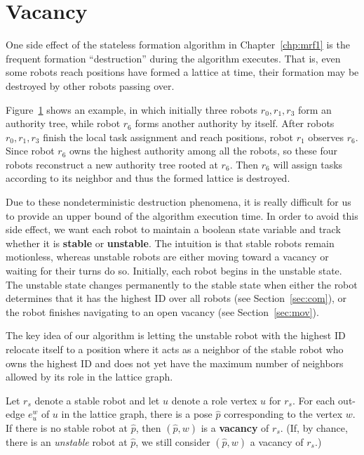 \section{Vacancy}
\label{sec:vacancy}
One side effect of the stateless formation algorithm in Chapter~\ref{chp:mrf1} is the frequent formation ``destruction'' during the algorithm executes. 
%
That is, even some robots reach positions have formed 
a lattice at time, their formation may be destroyed by other robots passing over. 


Figure~\ref{fig:destruction} shows an example, in which initially three robots $r_0, r_1, r_3$ form an authority tree, while robot $r_6$ forms another authority by itself.
%
After robots $r_0, r_1, r_3$ finish the local task assignment and reach positions, robot $r_1$ observes $r_6$.
%
Since robot $r_6$ owns the highest authority among all the robots, so these four robots reconstruct a new authority tree rooted at $r_6$. Then $r_6$ will assign tasks according to its neighbor and thus the formed lattice is destroyed.

\begin{figure}
\centering  

\label{fig:destruction}
\end{figure}

Due to these nondeterministic destruction phenomena, it is really difficult for us to provide 
an upper bound of the algorithm execution time. 
%
In order to avoid this side effect, we want each robot to maintain a boolean state variable 
and track whether it is \textbf{stable} or \textbf{unstable}.  
%
The intuition is that stable robots remain motionless, whereas unstable robots
are either moving toward a vacancy or waiting for their turns do so.
%
Initially, each robot begins in the unstable state.
%
The unstable state changes permanently to the stable state when either the robot determines
that it has the highest ID over all robots (see Section~\ref{sec:com}), or the
robot finishes navigating to an open vacancy (see Section~\ref{sec:mov}).


The key idea of our algorithm is letting the unstable robot with the highest ID relocate itself 
to a position where it acts as a neighbor of the stable robot who owns the highest ID 
and does not yet have the maximum number of neighbors allowed by its role in the
lattice graph.

\begin{defn}
  Let $r_s$ denote a stable robot and let $u$ denote a role vertex $u$ for
  $r_s$.  For each out-edge $e_{u}^w$ of $u$ in the lattice graph, there is a
  pose $\hat{p}$ corresponding to the vertex $w$. 
  If there is no stable robot
  at $\hat{p}$, then $(\hat{p}, w)$ is a \textbf{vacancy} of $r_s$.
  (If, by chance, there is an \emph{unstable} robot at $\hat{p}$,
  we still consider $(\hat{p}, w)$ a vacancy of $r_s$.)
\end{defn}


